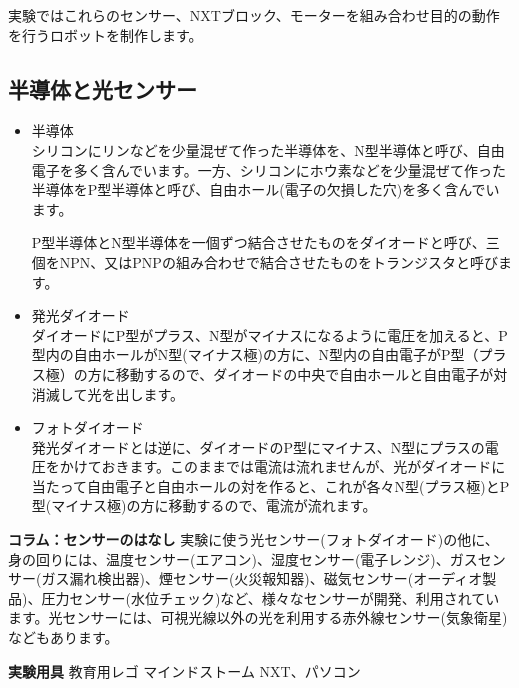 実験ではこれらのセンサー、NXTブロック、モーターを組み合わせ目的の動作を行うロボットを制作します。


\subsection{半導体と光センサー}
\label{light sensor}

\begin{itemize}

\item 半導体\\
シリコンにリンなどを少量混ぜて作った半導体を、N型半導体と呼び、自由電子を多く含んでいます。一方、シリコンにホウ素などを少量混ぜて作った半導体をP型半導体と呼び、自由ホール(電子の欠損した穴)を多く含んでいます。

P型半導体とN型半導体を一個ずつ結合させたものをダイオードと呼び、三個をNPN、又はPNPの組み合わせで結合させたものをトランジスタと呼びます。

\item 発光ダイオード\\
ダイオードにP型がプラス、N型がマイナスになるように電圧を加えると、P型内の自由ホールがN型(マイナス極)の方に、N型内の自由電子がP型（プラス極）の方に移動するので、ダイオードの中央で自由ホールと自由電子が対消滅して光を出します。

\item フォトダイオード\\
発光ダイオードとは逆に、ダイオードのP型にマイナス、N型にプラスの電圧をかけておきます。このままでは電流は流れませんが、光がダイオードに当たって自由電子と自由ホールの対を作ると、これが各々N型(プラス極)とP型(マイナス極)の方に移動するので、電流が流れます。
\end{itemize}

\begin{itembox}[l]{\bf コラム：センサーのはなし}
実験に使う光センサー(フォトダイオード)の他に、身の回りには、温度センサー(エアコン)、湿度センサー(電子レンジ)、ガスセンサー(ガス漏れ検出器)、煙センサー(火災報知器)、磁気センサー(オーディオ製品)、圧力センサー(水位チェック)など、様々なセンサーが開発、利用されています。光センサーには、可視光線以外の光を利用する赤外線センサー(気象衛星)などもあります。
\end{itembox}







\newpage

\jikken

\begin{itemsquarebox}[c]{\bf 実験用具}
教育用レゴ マインドストーム NXT、パソコン
\end{itemsquarebox}

